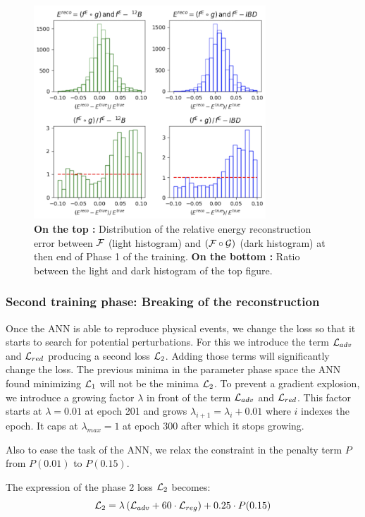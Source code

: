 \documentclass[../main.tex]{subfiles}
\begin{document}
\begin{figure}[!ht]
  \centering
  \includegraphics[height=8cm]{images/janne/rec_err_200.png}
  \caption{\textbf{On the top :} Distribution of the relative energy reconstruction error between ${\cal F}$ (light histogram) and $({\cal F} \circ {\cal G})$ (dark histogram) at then end of Phase 1 of the training. \textbf{On the bottom :} Ratio between the light and dark histogram of the top figure.}
  \label{fig:janne:rec_err_200}
\end{figure}


\subsubsection{Second training phase: Breaking of the reconstruction}
\label{sec:janne:results:break}

Once the ANN is able to reproduce physical events, we change the loss so that it starts to search for potential perturbations.
For this we introduce the term ${\cal L}_{adv}$ and ${\cal L}_{red}$ producing a second loss ${\cal L}_2$.
Adding those terms will significantly change the loss.
The previous minima in the parameter phase space the ANN found minimizing ${\cal L}_1$ will not be the minima ${\cal L}_2$. To prevent a gradient explosion, we introduce a growing factor $\lambda$ in front of the term ${\cal L}_{adv}$ and ${\cal L}_{red}$. This factor starts at $\lambda  = 0.01$ at epoch 201 and grows $\lambda_{i+1} = \lambda_{i} + 0.01$ where $i$ indexes the epoch. It caps at $\lambda_{max} = 1$ at epoch 300 after which it stops growing.

Also to ease the task of the ANN, we relax the constraint in the penalty term $P$ from $P(0.01)$ to $P(0.15)$.

The expression of the phase 2 loss ${\cal L}_2$ becomes:
\begin{equation}
  \label{eq:janne:phase_2:loss}
  {\cal L}_2 = \lambda \left( {\cal L}_{adv} + 60 \cdot {\cal L}_{reg} \right) + 0.25 \cdot P(0.15)
\end{equation}
\end{document}
